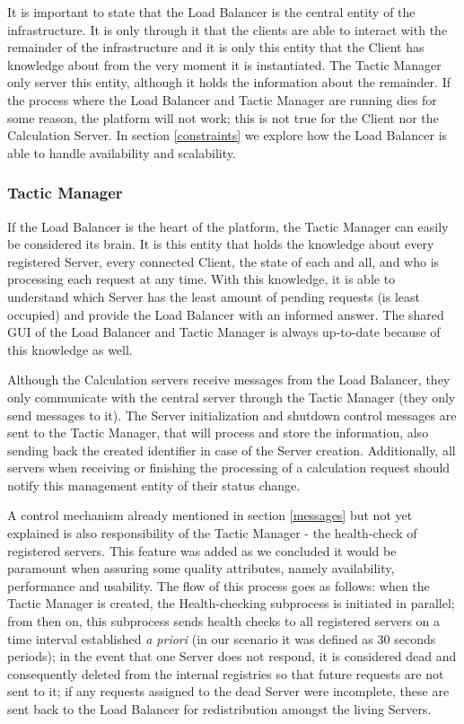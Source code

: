 \documentclass[12pt]{article}
\begin{document}
It is important to state that the Load Balancer is the central entity of the infrastructure.
It is only through it that the clients are able to interact with the remainder of the infrastructure and it is only this entity that the Client has knowledge 
about from the very moment it is instantiated.
The Tactic Manager only server this entity, although it holds the information about the remainder.
If the process where the Load Balancer and Tactic Manager are running dies for some reason, the platform will not work; this is not true for the Client nor the 
Calculation Server.
In section \ref{constraints} we explore how the Load Balancer is able to handle availability and scalability.

\subsubsection{Tactic Manager}

If the Load Balancer is the heart of the platform, the Tactic Manager can easily be considered its brain.
It is this entity that holds the knowledge about every registered Server, every connected Client, the state of each and all, and who is processing each request 
at any time.
With this knowledge, it is able to understand which Server has the least amount of pending requests (is least occupied) and provide the Load Balancer with an 
informed answer.
The shared GUI of the Load Balancer and Tactic Manager is always up-to-date because of this knowledge as well.

Although the Calculation servers receive messages from the Load Balancer, they only communicate with the central server through the Tactic Manager (they only 
send messages to it). 
The Server initialization and shutdown control messages are sent to the Tactic Manager, that will process and store the information, also sending back the 
created identifier in case of the Server creation.
Additionally, all servers when receiving or finishing the processing of a calculation request should notify this management entity of their status change.

A control mechanism already mentioned in section \ref{messages} but not yet explained is also responsibility of the Tactic Manager - the health-check of 
registered servers.
This feature was added as we concluded it would be paramount when assuring some quality attributes, namely availability, performance and usability.
The flow of this process goes as follows: when the Tactic Manager is created, the Health-checking subprocess is initiated in parallel; from then on, this
subprocess sends health checks to all registered servers on a time interval established \textit{a priori} (in our scenario it was defined as 30 seconds periods);
in the event that one Server does not respond, it is considered dead and consequently deleted from the internal registries so that future requests are not sent 
to it; if any requests assigned to the dead Server were incomplete, these are sent back to the Load Balancer for redistribution amongst the living Servers.
\end{document}
